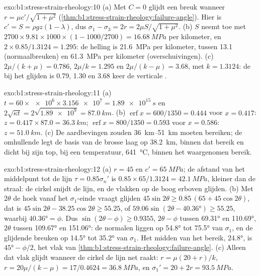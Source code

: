 \begin{solution}{exo:b1:stress-strain-rheology:10}
(a) Met $C = 0$ glijdt een breuk wanneer $r = \mu c'/\sqrt{1+\mu^2}$
(\cref{thm:b1:stress-strain-rheology:failure-angle}). Hier is $c' = S =
\rho g z(1-\lambda)$, dus $\sigma_1 - \sigma_3 = 2r = 2\mu S/\sqrt{1+\mu^2}$.
(b) $S$ neemt toe met $2700\times9.81\times1000\times(1 - 1000/2700) =
\qty{16.68}{MPa}$ per kilometer, en $2\times0.85/1.3124 = 1.295$: de helling
is \qty{21.6}{MPa} per kilometer, tussen \num{13.1} (normaalbreuken) en
\qty{61.3}{MPa} per kilometer (overschuivingen). (c) $2\mu/(k+\mu) = 0.786$,
$2\mu/k = 1.295$ en $2\mu/(k-\mu) = 3.68$, met $k = 1.3124$: de
 bij het glijden is 0.79, 1.30 en 3.68 keer de verticale
.
\end{solution}

\begin{solution}{exo:b1:stress-strain-rheology:11}
(a) $t = 60\times\num{e6}\times\num{3.156e7} = \qty{1.89e15}{s}$ en
$2\sqrt{\kappa t} = 2\sqrt{\num{1.89e9}} = \qty{87.0}{km}$. (b)
$\operatorname{erf}x = 600/1350 = 0.444$ voor $x = 0.417$: $z = 0.417\times87.0
= \qty{36.3}{km}$; $\operatorname{erf}x = 800/1350 = 0.593$ voor $x = 0.586$:
$z = \qty{51.0}{km}$. (c) De aardbevingen zouden \qtyrange{36}{51}{km} moeten
bereiken; de omhullende legt de basis van de brosse laag op \qty{38.2}{km},
binnen dat bereik en dicht bij zijn top, bij een temperatuur, \qty{641}{\degreeCelsius},
binnen het waargenomen bereik.
\end{solution}

\begin{solution}{exo:b1:stress-strain-rheology:12}
(a) $r = 45$ en $c' = \qty{65}{MPa}$; de afstand van het middelpunt tot de lijn
$\tau = 0.85\sigma_n'$ is $0.85\times65/1.3124 = \qty{42.1}{MPa}$, kleiner dan
de straal: de cirkel snijdt de lijn, en de vlakken op de boog erboven glijden.
(b) Met $2\theta$ de hoek vanaf het $\sigma_1$-einde vraagt glijden
$45\sin2\theta \ge 0.85\,(65 + 45\cos2\theta)$, dat is
$45\sin2\theta - 38.25\cos2\theta \ge 55.25$, of
$59.06\sin(2\theta - \ang{40.36}) \ge 55.25$, waarbij $\ang{40.36} = \phi$.
Dus $\sin(2\theta - \phi) \ge 0.9355$, $2\theta - \phi$ tussen \ang{69.31}
en \ang{110.69}, $2\theta$ tussen \ang{109.67} en \ang{151.06}: de normalen
liggen op \ang{54.8} tot \ang{75.5} van $\sigma_1$, en de glijdende breuken
op \ang{14.5} tot \ang{35.2} van $\sigma_1$. Het midden van het bereik,
\ang{24.8}, is $\ang{45} - \phi/2$, het vlak van
\cref{thm:b1:stress-strain-rheology:failure-angle}. (c) Alleen dat vlak glijdt
wanneer de cirkel de lijn net raakt: $r = \mu(20 + r)/k$, $r = 20\mu/(k -
\mu) = 17/0.4624 = \qty{36.8}{MPa}$, en $\sigma_1' = 20 + 2r =
\qty{93.5}{MPa}$.
\end{solution}

